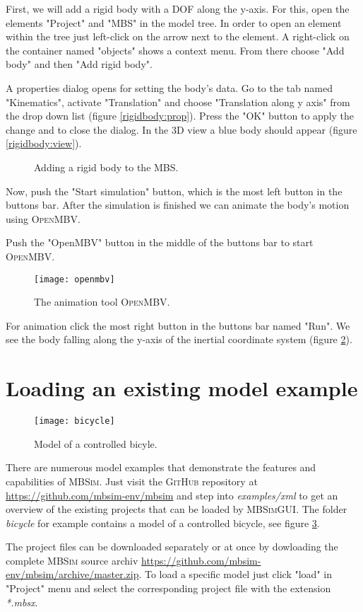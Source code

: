 \documentclass[
a4paper,
fleqn,
DIV=15,
pagesize
]{scrartcl}
\begin{document}
First, we will add a rigid body with a DOF along the {\color{green}y-axis}. For this,
open the elements "Project" and "MBS" in the model tree. In order to open an
element within the tree just left-click on the arrow next to the element.
A right-click on the container named "objects" shows a context menu. From there
choose "Add body" and then "Add rigid body".

A properties dialog opens for setting the body's data. Go to the tab named
"Kinematics", activate "Translation" and choose "Translation along y axis" from
the drop down list (figure \ref{rigidbody:prop}). Press the "OK" button to
apply the change and to close the dialog. In the 3D view a blue body should
appear (figure \ref{rigidbody:view}).
\begin{figure}
\centering
{}
\caption{Adding a rigid body to the MBS.} \label{rigidbody}
\end{figure}

Now, push the "Start simulation" button, which is the most left button in the
buttons bar. After the simulation is finished we can animate the body's
motion using \textsc{OpenMBV}.

Push the "OpenMBV" button in the middle of the buttons bar to start
\textsc{OpenMBV}.
\begin{figure}
\centering
\texttt{[image: openmbv]}
\caption{The animation tool \textsc{OpenMBV}.} \label{openmbv}
\end{figure}
For animation click
the most right button in the buttons bar named "Run". We see the body falling
along the {\color{green}y-axis} of the inertial coordinate system (figure
\ref{openmbv}).

\section{Loading an existing model example}

\begin{figure}
\centering
\texttt{[image: bicycle]}
\caption{Model of a controlled bicyle.} \label{bicycle}
\end{figure}
There are numerous model examples that demonstrate the features and capabilities of \textsc{MBSim}. Just visit the \textsc{GitHub} repository at \url{https://github.com/mbsim-env/mbsim} and step into \emph{examples/xml} to get an overview of the existing projects that can be loaded by \textsc{MBSimGUI}. The folder \emph{bicycle} for example contains a model of a controlled bicycle, see figure \ref{bicycle}.

The project files can be downloaded separately or at once by dowloading the complete \textsc{MBSim} source archiv \url{https://github.com/mbsim-env/mbsim/archive/master.zip}. To load a specific model just click "load" in "Project" menu and select the corresponding project file with the extension \emph{*.mbsx}.
\end{document}
